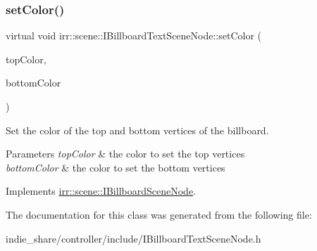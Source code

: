 \mbox{\label{classirr_1_1scene_1_1IBillboardTextSceneNode_ab3faa7c4238acd6bc3a2330cb5650da5}} 
\subsubsection{\texorpdfstring{set\+Color()}{setColor()}\hspace{0.1cm}{\footnotesize\ttfamily [4/4]}}
{\footnotesize\ttfamily virtual void irr\+::scene\+::\+I\+Billboard\+Text\+Scene\+Node\+::set\+Color (\begin{DoxyParamCaption}\item[{const \hyperlink{classirr_1_1video_1_1SColor}{video\+::\+S\+Color} \&}]{top\+Color,  }\item[{const \hyperlink{classirr_1_1video_1_1SColor}{video\+::\+S\+Color} \&}]{bottom\+Color }\end{DoxyParamCaption})\hspace{0.3cm}{\ttfamily [pure virtual]}}



Set the color of the top and bottom vertices of the billboard. 


\begin{DoxyParams}{Parameters}
{\em top\+Color} & the color to set the top vertices \\
\hline
{\em bottom\+Color} & the color to set the bottom vertices \\
\hline
\end{DoxyParams}


Implements \hyperlink{classirr_1_1scene_1_1IBillboardSceneNode_a13efdfa73998706baf10cedcdb48d559}{irr\+::scene\+::\+I\+Billboard\+Scene\+Node}.



The documentation for this class was generated from the following file\+:\begin{DoxyCompactItemize}
\item 
indie\+\_\+share/controller/include/I\+Billboard\+Text\+Scene\+Node.\+h\end{DoxyCompactItemize}
